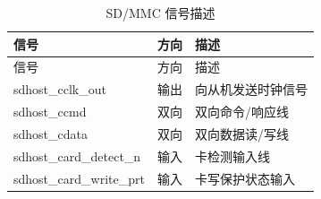 \begin{longtable}[c]{ |p{3.5cm}|p{4cm}|p{8cm}| }
\caption{SD/MMC 信号描述} \label{tab:sdhost-signal-description}\\
\hline
\rowcolor{lightgray}
信号 & 方向 & 描述 \\
\hline
\endfirsthead
\hline
\rowcolor{lightgray}
信号 & 方向 & 描述  \\
\hline
\endhead
\endfoot
sdhost\_cclk\_out & 输出 & 向从机发送时钟信号	\\\hline
sdhost\_ccmd & 双向 & 双向命令/响应线  \\\hline
sdhost\_cdata & 双向 & 双向数据读/写线	\\\hline
sdhost\_card\_detect\_n & 输入 &  卡检测输入线 \\\hline
sdhost\_card\_write\_prt & 输入 & 卡写保护状态输入 	\\\hline
\end{longtable}
